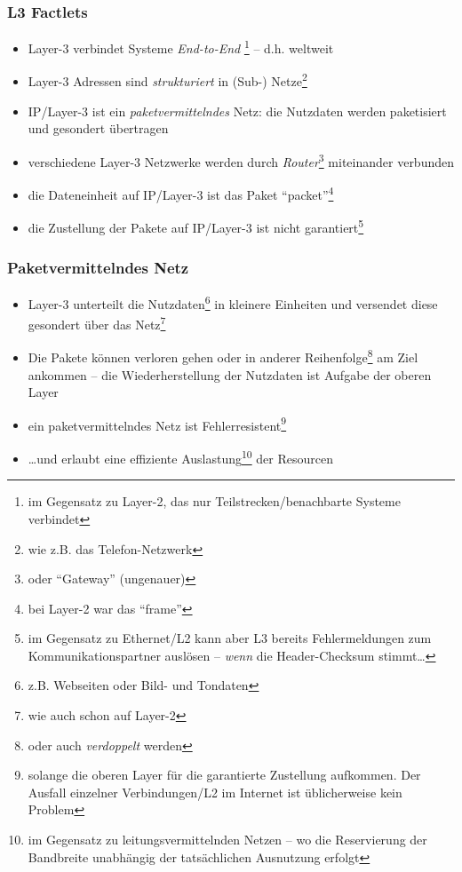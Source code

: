 \documentclass{beamer}
\begin{document}
\begin{frame}
\frametitle{L3 Factlets}
\begin{itemize}
	\item{Layer-3 verbindet Systeme {\em End-to-End} \footnote{im Gegensatz zu Layer-2, das nur Teilstrecken/benachbarte Systeme verbindet} -- d.h. weltweit}
	\item{Layer-3 Adressen sind {\em strukturiert} in (Sub-) Netze\footnote{wie z.B. das Telefon-Netzwerk}}
	\item{IP/Layer-3 ist ein {\em paketvermittelndes} Netz: die Nutzdaten werden paketisiert und gesondert \"ubertragen}
	\item{verschiedene Layer-3 Netzwerke werden durch {\em Router}\footnote{oder ``Gateway'' (ungenauer)} miteinander verbunden}
	\item{die Dateneinheit auf IP/Layer-3 ist das Paket ``packet''\footnote{bei Layer-2 war das ``frame''}}
	\item{die Zustellung der Pakete auf IP/Layer-3 ist nicht garantiert\footnote{im Gegensatz zu Ethernet/L2 kann aber L3 bereits Fehlermeldungen zum Kommunikationspartner ausl\"osen -- \emph{wenn} die Header-Checksum stimmt\ldots}}
\end{itemize}
\end{frame}

\begin{frame}
\frametitle{Paketvermittelndes Netz}
\begin{itemize}
	\item{Layer-3 unterteilt die Nutzdaten\footnote{z.B. Webseiten oder Bild- und Tondaten} in kleinere Einheiten und versendet diese gesondert \"uber das Netz\footnote{wie auch schon auf Layer-2}}
	\item{Die Pakete k\"onnen verloren gehen oder in anderer Reihenfolge\footnote{oder auch {\em verdoppelt} werden} am Ziel ankommen -- die Wiederherstellung der Nutzdaten ist Aufgabe der oberen Layer}
	\item{ein paketvermittelndes Netz ist Fehlerresistent\footnote{solange die oberen Layer f\"ur die garantierte Zustellung aufkommen. Der Ausfall einzelner Verbindungen/L2 im Internet ist \"ublicherweise kein Problem}}
	\item{\ldots und erlaubt eine effiziente Auslastung\footnote{im Gegensatz zu leitungsvermittelnden Netzen -- wo die Reservierung der Bandbreite unabh\"angig der tats\"achlichen Ausnutzung erfolgt} der Resourcen}
\end{itemize}
\end{frame}
\end{document}
